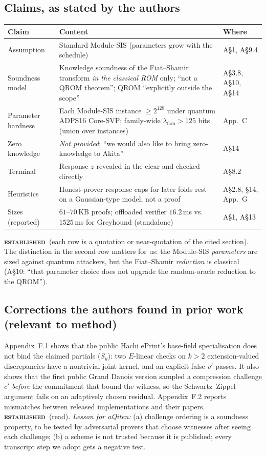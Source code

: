 \documentclass[11pt]{article}
\newcommand{\epitag}[3]{\colorbox{#2}{\textcolor{#1}{\textsc{\footnotesize\bfseries #3}}}}
\newcommand{\established}{\epitag{estgreen}{estbg}{established}}
\renewcommand{\_}{\textunderscore\allowbreak{}}
\theoremstyle{definition}
\begin{document}
\subsection{Claims, as stated by the authors}
\begin{center}
\small\renewcommand{\arraystretch}{1.2}
\begin{tabular}{@{}p{}p{}p{}@{}}
\toprule
\textbf{Claim} & \textbf{Content} & \textbf{Where}\\
\midrule
Assumption & Standard Module-SIS (parameters grow with the schedule) & A\S1, A\S9.4\\
Soundness model & Knowledge soundness of the Fiat--Shamir transform \emph{in the classical ROM} only; ``not a QROM theorem''; QROM ``explicitly outside the scope'' & A\S3.8, A\S10, A\S14\\
Parameter hardness & Each Module-SIS instance $\ge2^{128}$ under quantum ADPS16 Core-SVP; family-wide $\lambda_{\mathrm{fam}}>125$ bits (union over instances) & App.~C\\
Zero knowledge & \emph{Not provided}; ``we would also like to bring zero-knowledge to Akita'' & A\S14\\
Terminal & Response $z$ revealed in the clear and checked directly & A\S8.2\\
Heuristics & Honest-prover response caps for later folds rest on a Gaussian-type model, not a proof & A\S2.8, \S14, App.~G\\
Sizes (reported) & $61$--$70$\,KB proofs; offloaded verifier $16.2$\,ms vs.\ $1525$\,ms for Greyhound (standalone) & A\S1, A\S13\\
\bottomrule
\end{tabular}
\end{center}
\established\ (each row is a quotation or near-quotation of the cited section). The distinction in the second row matters for us: the Module-SIS \emph{parameters} are sized against quantum attackers, but the Fiat--Shamir \emph{reduction} is classical (A\S10: ``that parameter choice does not upgrade the random-oracle reduction to the QROM'').

\subsection{Corrections the authors found in prior work (relevant to method)}
Appendix~F.1 shows that the public Hachi ePrint's base-field specialisation does not bind the claimed partials ($S_y$): two $E$-linear checks on $k>2$ extension-valued discrepancies have a nontrivial joint kernel, and an explicit false $v'$ passes. It also shows that the first public Grand Danois version sampled a compression challenge $c'$ \emph{before} the commitment that bound the witness, so the Schwartz--Zippel argument fails on an adaptively chosen residual. Appendix~F.2 reports mismatches between released implementations and their papers.
\established\ (read). \emph{Lesson for aQiten:} (a) challenge ordering is a soundness property, to be tested by adversarial provers that choose witnesses after seeing each challenge; (b) a scheme is not trusted because it is published; every transcript step we adopt gets a negative test.
\end{document}

